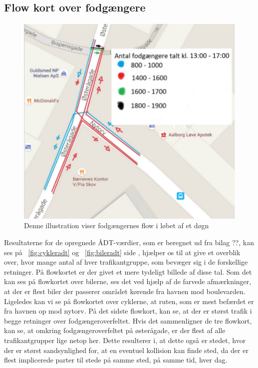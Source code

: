  \subsection{Flow kort over fodgængere}
 \begin{figure}[htbp]
   \centering
   \begin{adjustbox}{max width=\textwidth}
     \includegraphics[scale=0.6]{figures/Billederogfigur/fodflow.jpg}
  \end{adjustbox}
   \caption{Denne illustration viser fodgængernes flow i løbet af et døgn \autocite{gm2015}}
   \label{fig:fodflow}
 \end{figure}

Resultaterne for de opregnede ÅDT-værdier, som er beregnet ud fra bilag ??, kan ses på ~\cref{fig:cykleradt} og ~\cref{fig:bileradt} side \pageref*{fig:cykleradt}, hjælper os til at give et overblik over, hvor mange antal af hver trafikantgruppe, som bevæger sig i de forskellige retninger. På flowkortet er der givet et mere tydeligt billede af disse tal. Som det kan ses på flowkortet over bilerne, ses det ved hjælp af de farvede afmærkninger, at der er flest biler der passerer området kørende fra havnen mod boulevarden. Ligeledes kan vi se på flowkortet over cyklerne, at ruten, som er mest befærdet er fra havnen op mod nytorv. På det sidste flowkort, kan se, at der er størst trafik i begge retninger over fodgængeroverfeltet. Hvis det sammenligner de tre flowkort, kan se, at omkring fodgængeroverfeltet på østerågade, er der flest af alle trafikantgrupper lige netop her. Dette resulterer i, at dette også er stedet, hvor der er størst sandsynlighed for, at en eventuel kollision kan finde sted, da der er flest implicerede parter til stede på samme sted, på samme tid, hver dag.
